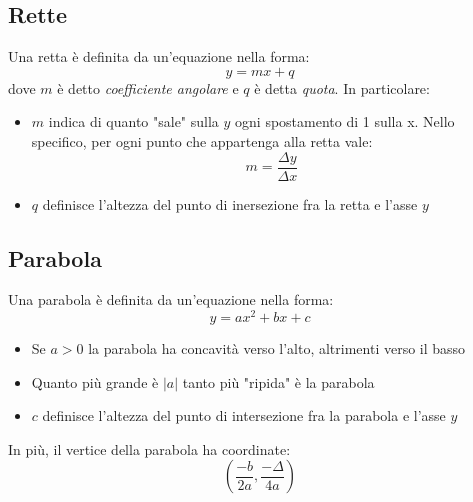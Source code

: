 \subsection{Rette}
Una retta è definita da un'equazione nella forma:
\[
	y = mx + q
\]
dove $ m $ è detto \textit{coefficiente angolare} e  $ q $ è detta \textit{quota}. In particolare:
\begin{itemize}
	\item $ m $ indica di quanto "sale" sulla $ y $ ogni spostamento di 1 sulla x. Nello specifico, per ogni punto che appartenga alla retta vale:
	      \[
		      m = \frac{\Delta y}{\Delta x}
	      \]
	\item $ q $ definisce l'altezza del punto di inersezione fra la retta e l'asse $ y $
\end{itemize}
\subsection{Parabola}
Una parabola è definita da un'equazione nella forma:
\[
	y = ax^2 + bx + c
\]
\begin{itemize}
	\item Se $ a > 0 $ la parabola ha concavità verso l'alto, altrimenti verso il basso
	\item Quanto più grande è $ \left|a\right| $ tanto più "ripida" è la parabola
	\item $ c $ definisce l'altezza del punto di intersezione fra la parabola e l'asse $ y $
\end{itemize}
In più, il vertice della parabola ha coordinate:
\[
	\left(\frac{-b}{2a}, \frac{-\Delta }{4a}\right)
\]








